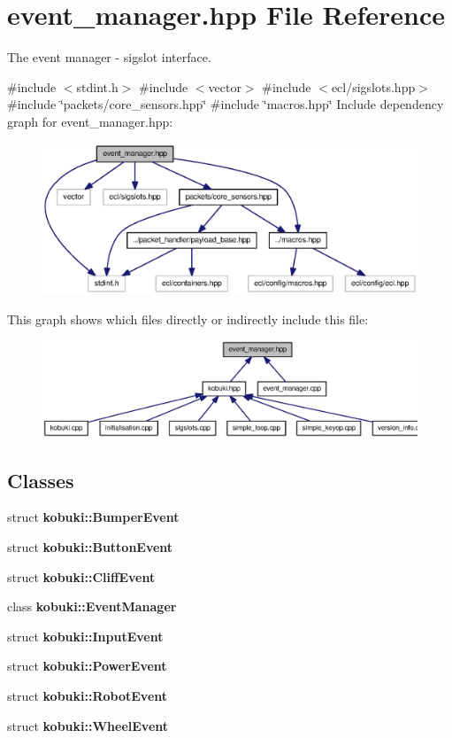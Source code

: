 \section{event\-\_\-manager.\-hpp \-File \-Reference}
\label{event__manager_8hpp}


\-The event manager -\/ sigslot interface.  


{\ttfamily \#include $<$stdint.\-h$>$}\*
{\ttfamily \#include $<$vector$>$}\*
{\ttfamily \#include $<$ecl/sigslots.\-hpp$>$}\*
{\ttfamily \#include \char`\"{}packets/core\-\_\-sensors.\-hpp\char`\"{}}\*
{\ttfamily \#include \char`\"{}macros.\-hpp\char`\"{}}\*
\-Include dependency graph for event\-\_\-manager.\-hpp\-:
\nopagebreak
\begin{figure}[H]
\begin{center}
\leavevmode
\includegraphics[width=350pt]{event__manager_8hpp__incl}
\end{center}
\end{figure}
\-This graph shows which files directly or indirectly include this file\-:
\nopagebreak
\begin{figure}[H]
\begin{center}
\leavevmode
\includegraphics[width=350pt]{event__manager_8hpp__dep__incl}
\end{center}
\end{figure}
\subsection*{\-Classes}
\begin{DoxyCompactItemize}
\item 
struct {\bf kobuki\-::\-Bumper\-Event}
\item 
struct {\bf kobuki\-::\-Button\-Event}
\item 
struct {\bf kobuki\-::\-Cliff\-Event}
\item 
class {\bf kobuki\-::\-Event\-Manager}
\item 
struct {\bf kobuki\-::\-Input\-Event}
\item 
struct {\bf kobuki\-::\-Power\-Event}
\item 
struct {\bf kobuki\-::\-Robot\-Event}
\item 
struct {\bf kobuki\-::\-Wheel\-Event}
\end{DoxyCompactItemize}
